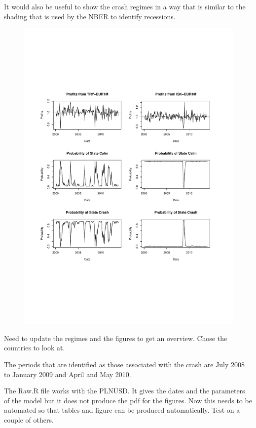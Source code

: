 \documentclass[12pt, a4paper, oneside]{article} %
\begin{document}
It would also be useful to show the crash regimes in a way that is similar to the shading that is used by the NBER to identify recessions.   

 
\begin{figure}[h!]
\centering
\includegraphics[scale = .80]{../Figures/2RegProb/ISKTRYEUR.pdf}
\end{figure}

Need to update the regimes and the figures to get an overview.  Chose the countries to look at. 

The periods that are identified as those associated with the crash are July 2008 to January 2009 and April and May 2010.  

The Raw.R file works with the PLNUSD.  It gives the dates and the parameters of the model but it does not produce the pdf for the figures. Now this needs to be automated so that tables and figure can be produced automatically. Test on a couple of others. 
\end{document}
